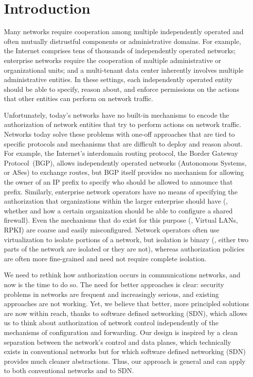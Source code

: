 \section{Introduction}

Many networks require cooperation among multiple independently operated
and often mutually distrustful components or administrative domains.
For example, the Internet comprises tens of thousands of independently
operated networks; enterprise networks require the cooperation of
multiple administrative or organizational units; and a multi-tenant data
center inherently involves multiple administrative entities.  In these
settings, each independently operated entity should be able to specify,
reason about, and enforce permissions on the actions that other entities can
perform on network traffic.

Unfortunately, today's networks have no built-in mechanisms to encode
the authorization of network entities that try to perform actions on
network traffic. Networks today solve these problems with one-off
approaches that are tied to specific protocols and mechanisms that are
difficult to deploy and reason about.  For example, the Internet's
interdomain routing protocol, the Border Gateway Protocol~(BGP), allows
independently operated networks (Autonomous Systems, or ASes) to
exchange routes, but BGP itself provides no mechanism for allowing the
owner of an IP prefix to specify who should be allowed to announce that
prefix. Similarly, enterprise network operators have no means of
specifying the authorization that organizations within the larger
enterprise should have (\eg, whether and how a certain organization
should be able to configure a shared firewall).  Even the mechanisms
that do exist for this purpose (\eg, Virtual LANs, RPKI) are coarse and
easily misconfigured. Network operators often use virtualization to
isolate portions of a network, but isolation is binary (\ie, either two
parts of the network are isolated or they are not), whereas
authorization policies are often more fine-grained and need not require
complete isolation.

We need to rethink how authorization occurs in communications networks,
and now is the time to do so.  The need for better approaches is clear:
security problems in networks are frequent and increasingly serious, and
existing approaches are not working.  Yet, we believe that better, more
principled solutions are now within reach, thanks to software defined
networking (SDN), which allows us to think about authorization of
network control independently of the mechanisms of configuration and
forwarding.  Our design is inspired by a clean separation between the
network's control and data planes, which technically exists in
conventional networks but for which software defined networking (SDN)
provides much cleaner abstractions. Thus, our approach is general and
can apply to both conventional networks and to SDN.

